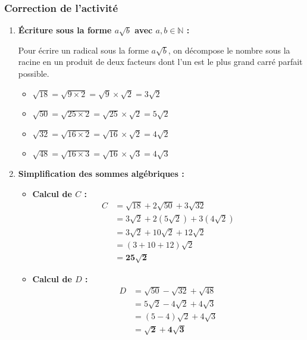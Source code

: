 \documentclass[12pt,a4paper]{article}
\begin{document}
\subsubsection*{\color{myred} Correction de l'activité}

\begin{enumerate}[label=\alph*)]
    \item \textbf{Écriture sous la forme $a\sqrt{b}$ avec $a, b \in \mathbb{N}$ :}
    
    Pour écrire un radical sous la forme $a\sqrt{b}$, on décompose le nombre sous la racine en un produit de deux facteurs dont l'un est le plus grand carré parfait possible.

    \begin{itemize}
        \item $\sqrt{18} = \sqrt{9 \times 2} = \sqrt{9} \times \sqrt{2} = 3\sqrt{2}$
        \item $\sqrt{50} = \sqrt{25 \times 2} = \sqrt{25} \times \sqrt{2} = 5\sqrt{2}$
        \item $\sqrt{32} = \sqrt{16 \times 2} = \sqrt{16} \times \sqrt{2} = 4\sqrt{2}$
        \item $\sqrt{48} = \sqrt{16 \times 3} = \sqrt{16} \times \sqrt{3} = 4\sqrt{3}$
    \end{itemize}

    \vspace{0.3cm}

    \item \textbf{Simplification des sommes algébriques :}

    \begin{itemize}
        \item \textbf{Calcul de $C$ :}
        \begin{align*}
        C &= \sqrt{18} + 2\sqrt{50} + 3\sqrt{32} \\
          &= 3\sqrt{2} + 2(5\sqrt{2}) + 3(4\sqrt{2}) \\
          &= 3\sqrt{2} + 10\sqrt{2} + 12\sqrt{2} \\
          &= (3 + 10 + 12)\sqrt{2} \\
          &= \mathbf{25\sqrt{2}}
        \end{align*}

        \item \textbf{Calcul de $D$ :}
        \begin{align*}
        D &= \sqrt{50} - \sqrt{32} + \sqrt{48} \\
          &= 5\sqrt{2} - 4\sqrt{2} + 4\sqrt{3} \\
          &= (5 - 4)\sqrt{2} + 4\sqrt{3} \\
          &= \mathbf{\sqrt{2} + 4\sqrt{3}}
        \end{align*}
    \end{itemize}
\end{enumerate}
\end{document}
